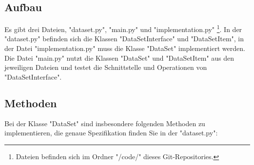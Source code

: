 \documentclass[
    oneside, %
    12pt, %
    a4paper, %
    parskip=full %
]{scrartcl}
\begin{document}
\subsection{Aufbau}



Es gibt drei Dateien, "dataset.py", "main.py" und "implementation.py"
\footnote{Dateien befinden sich im Ordner "/code/" dieses Git-Repositories.}.
In der "dataset.py" befinden sich die Klassen "DataSetInterface" und "DataSetItem",
in der Datei "implementation.py" muss die Klasse "DataSet" implementiert werden.
Die Datei "main.py" nutzt die Klassen "DataSet" und "DataSetItem" aus den jeweiligen Dateien und testet die Schnittstelle und Operationen von "DataSetInterface".\\

\subsection{Methoden}

Bei der Klasse "DataSet" sind insbesondere folgenden Methoden zu implementieren, die genaue Spezifikation finden Sie in der "dataset.py":



\end{document}
